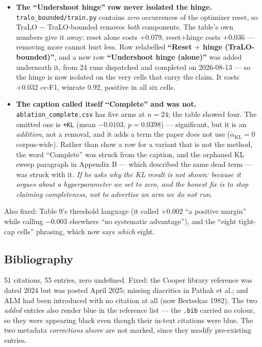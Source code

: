 \documentclass[11pt,a4paper]{article}
\begin{document}
\begin{itemize}
\item \textbf{The ``Undershoot hinge'' row never isolated the hinge.}
\texttt{tralo\_bounded/train.py} contains \emph{zero} occurrences of the
optimizer reset, so TraLO $-$ TraLO-bounded removes \emph{both} components. The table's own
numbers give it away: reset alone costs $+0.079$, reset$+$hinge costs $+0.036$ --- removing
more cannot hurt less. Row relabelled \textbf{``Reset $+$ hinge (TraLO-bounded)''}, and a
new row \textbf{``Undershoot hinge (alone)''} was added underneath it, from 24 runs
dispatched and completed on 2026-08-13 --- so the hinge is now isolated on the very cells
that carry the claim. It costs $+0.032$ cc-F1, winrate $0.92$, positive in all six cells.
\item \textbf{The caption called itself ``Complete'' and was not.}
\texttt{ablation\_complete.csv} has five arms at $n{=}24$; the table showed four. The
omitted one is \texttt{+KL} (mean $-0.0103$, $p{=}0.0398$) --- significant, but it is an
\emph{addition}, not a removal, and it adds a term the paper does not use
($\alpha_{\mathrm{KL}}{=}0$ corpus-wide). Rather than show a row for a variant that is not
the method, the word ``Complete'' was struck from the caption, and the orphaned KL sweep
paragraph in Appendix B --- which described the same dead term --- was struck with it.
\emph{If he asks why the KL result is not shown: because it argues about a hyperparameter
we set to zero, and the honest fix is to stop claiming completeness, not to advertise an
arm we do not run.}
\end{itemize}

\noindent Also fixed: Table 9's threshold language (it called $+0.002$ ``a positive
margin'' while calling $-0.003$ elsewhere ``no systematic advantage''), and the
``eight tight-cap cells'' phrasing, which now says \emph{which} eight.

\subsection{Bibliography}
51 citations, 55 entries, zero undefined. Fixed: the Cooper library reference was dated
2024 but was posted April 2025; missing diacritics in Pathak et al.; and ALM had been
introduced with no citation at all (now Bertsekas 1982). The two \emph{added} entries also
render blue in the reference list --- the \texttt{.bib} carried no colour, so they were
appearing black even though their in-text citations were blue. The two metadata
\emph{corrections} above are not marked, since they modify pre-existing entries.
\end{document}
